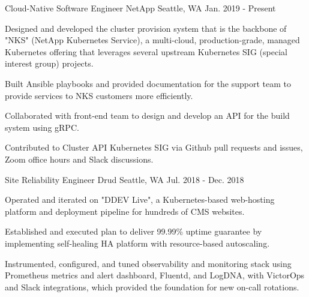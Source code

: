 


\begin{cventries}


\cventry
{Cloud-Native Software Engineer} %
{NetApp} %
{Seattle, WA} %
{Jan. 2019 - Present} %
{ %
\begin{cvitems}
\item {Designed and developed the cluster provision system that is the backbone of "NKS" (NetApp Kubernetes Service), a multi-cloud, production-grade, managed Kubernetes offering that leverages several upstream Kubernetes SIG (special interest group) projects.}
\item {Built Ansible playbooks and provided documentation for the support team to provide services to NKS customers more efficiently.}
\item {Collaborated with front-end team to design and develop an API for the build system using gRPC.}
\item {Contributed to Cluster API Kubernetes SIG via Github pull requests and issues, Zoom office hours and Slack discussions.}
\end{cvitems}
}


\cventry
{Site Reliability Engineer} %
{Drud} %
{Seattle, WA} %
{Jul. 2018 - Dec. 2018} %
{ %
\begin{cvitems}
\item {Operated and iterated on "DDEV Live", a Kubernetes-based web-hosting platform and deployment pipeline for hundreds of CMS websites.}
\item {Established and executed plan to deliver 99.99\% uptime guarantee by implementing self-healing HA platform with resource-based autoscaling.}
\item {Instrumented, configured, and tuned observability and monitoring stack using Prometheus metrics and alert dashboard, Fluentd, and LogDNA, with VictorOps and Slack integrations, which provided the foundation for new on-call rotations.}
\end{cvitems}
}


\end{cventries}
